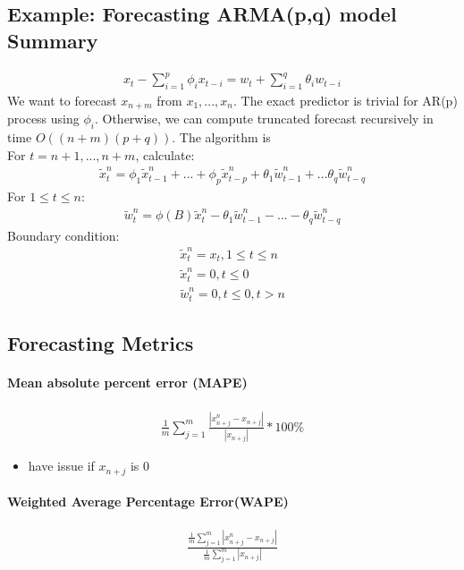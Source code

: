 \subsection{Example: Forecasting ARMA(p,q) model Summary}
    \begin{align*}
        x_t - \sum_{i=1}^p \phi_i x_{t-i} = w_t + \sum_{i=1}^q \theta_i w_{t-i}
    \end{align*}
We want to forecast $x_{n+m}$ from $x_1, ..., x_n$.  The exact predictor is trivial for AR(p) process using $\phi_i$. Otherwise, we can compute truncated forecast recursively in time $O((n+m)(p+q))$. The algorithm is \\
For $t = n+1, ..., n+m$, calculate: 
    \begin{align*}
    \tilde{x}_t^n = \phi_1 \tilde{x}_{t-1}^n + ... + \phi_p \tilde{x}_{t-p}^n + \theta_1 \tilde{w}_{t-1}^n + ... \theta_q \tilde{w}_{t-q}^n
    \end{align*}
For $1 \leq t \leq n$: 
    \begin{align*}
        \tilde{w}_t^n = \phi(B) \tilde{x}_t^n - \theta_1 \tilde{w}_{t-1}^n - ... - \theta_q \tilde{w}_{t-q}^n
    \end{align*}
Boundary condition: 
    \begin{align*}
        \tilde{x}_t^n = x_t, 1 \leq t \leq n \\
        \tilde{x}_t^n = 0, t \leq 0 \\
        \tilde{w}_t^n = 0, t \leq 0, t > n
    \end{align*}

    
\subsection{Forecasting Metrics} 
\paragraph{Mean absolute percent error (MAPE)}
    \begin{align*}
        \frac{1}{m} \sum_{j=1}^m \frac{|x_{n+j}^n - x_{n+j}|}{|x_{n+j}|} * 100\%
    \end{align*}
    \begin{itemize}
        \item have issue if $x_{n+j}$ is 0
    \end{itemize}
    
\paragraph{Weighted Average Percentage Error(WAPE)}
    \begin{align*}
        \frac{  \frac{1}{m}  \sum_{j=1}^m |x_{n+j}^n - x_{n+j}|}{\frac{1}{m}  \sum_{j=1}^m |x_{n+j}|}
    \end{align*}
